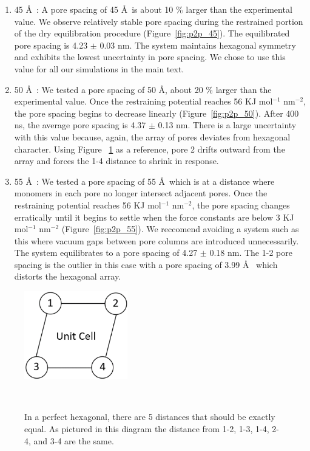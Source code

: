 \documentclass{article}
\begin{document}
\begin{enumerate}
\begin{enumerate}
		\item 45 \AA~: A pore spacing of 45 \AA~is about 10 \% larger
		than the experimental value. We observe relatively stable pore spacing during
		the restrained portion of the dry equilibration procedure
		(Figure~\ref{fig:p2p_45}). The equilibrated pore spacing is 4.23 $\pm$ 0.03 nm.
		The system maintains hexagonal symmetry and exhibits the lowest uncertainty in
		pore spacing. We chose to use this value for all our simulations in the main
		text. 

		\item 50 \AA~: We tested a pore spacing of 50 \AA, about 20 \% larger than the
		experimental value. Once the restraining potential reaches 56 KJ mol$^{-1}$
		nm$^{-2}$, the pore spacing begins to decrease linearly (Figure~\ref{fig:p2p_50}).
		After 400 ns, the average pore spacing is 4.37 $\pm$ 0.13 nm. There is a large
                uncertainty with this value because, again, the array of pores deviates from 
                hexagonal character. Using Figure ~\ref{fig:p2p_diagram} as a reference, pore 
                2 drifts outward from the array and forces the 1-4 distance to shrink in 
                response.
                
		\item 55 \AA~: We tested a pore spacing of 55 \AA~which is at
		a distance where monomers in each pore no longer intersect adjacent pores. Once
		the restraining potential reaches 56 KJ mol$^{-1}$ nm$^{-2}$, the pore spacing
		changes erratically until it begins to settle when the force constants are
		below 3 KJ mol$^{-1}$ nm$^{-2}$ (Figure~\ref{fig:p2p_55}). We reccomend
		avoiding a system such as this where vacuum gaps between pore columns are
		introduced unnecessarily. The system equilibrates to a pore spacing of 4.27
		$\pm$ 0.18 nm. The 1-2 pore spacing is the outlier in this case with a pore
                spacing of 3.99 \AA~ which distorts the hexagonal array. 

	  \end{enumerate} 

	  \begin{figure}
		\centering
		\includegraphics[width=0.4\textwidth]{p2p_diagram.png}
		\caption{In a perfect hexagonal, there are 5 distances that should be exactly
		equal. As pictured in this diagram the distance from 1-2, 1-3, 1-4, 2-4, and 3-4
		are the same.}~\label{fig:p2p_diagram}
	  \end{figure} 


\end{enumerate}
\end{document}
